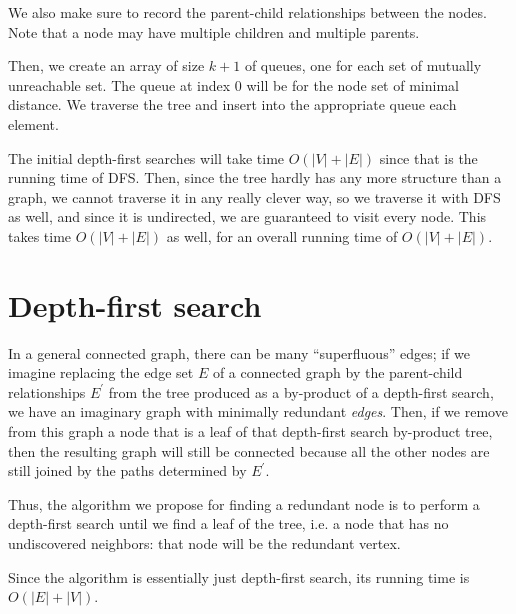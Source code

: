\documentclass{article}
\begin{document}
We also make sure to record the parent-child relationships between the nodes. Note that a node may have multiple children and multiple parents.

Then, we create an array of size $k + 1$ of queues, one for each set of mutually unreachable set. The queue at index $0$ will be for the node set of minimal distance. We traverse the tree and insert into the appropriate queue each element.

The initial depth-first searches will take time $O(|V| + |E|)$ since that is the running time of DFS. Then, since the tree hardly has any more structure than a graph, we cannot traverse it in any really clever way, so we traverse it with DFS as well, and since it is undirected, we are guaranteed to visit every node. This takes time $O(|V| + |E|)$ as well, for an overall running time of $O(|V| + |E|)$.



\section{Depth-first search}

In a general connected graph, there can be many ``superfluous'' edges; if we imagine replacing the edge set $E$ of a connected graph by the parent-child relationships $E^\prime$ from the tree produced as a by-product of a depth-first search, we have an imaginary graph with minimally redundant \emph{edges}. Then, if we remove from this graph a node that is a leaf of that depth-first search by-product tree, then the resulting graph will still be connected because all the other nodes are still joined by the paths determined by $E^\prime$.

Thus, the algorithm we propose for finding a redundant node is to perform a depth-first search until we find a leaf of the tree, i.e. a node that has no undiscovered neighbors: that node will be the redundant vertex.

Since the algorithm is essentially just depth-first search, its running time is $O(|E| + |V|)$.
\end{document}
